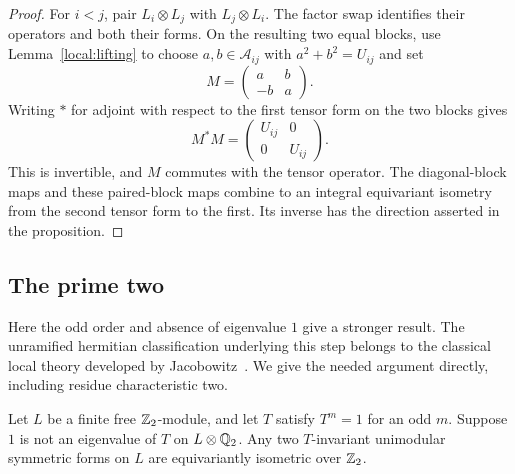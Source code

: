 \begin{proof}
For $i<j$, pair $L_i\otimes L_j$ with $L_j\otimes L_i$.
The factor swap identifies their operators and both their forms.
On the resulting two equal blocks, use
Lemma~\ref{local:lifting} to choose $a,b\in\mathcal A_{ij}$ with
$a^2+b^2=U_{ij}$ and set
\[
 M=\begin{pmatrix}a&b\\-b&a\end{pmatrix}.
\]
Writing $*$ for adjoint with respect to the first tensor form on
the two blocks gives
\[
 M^*M=\begin{pmatrix}U_{ij}&0\\0&U_{ij}\end{pmatrix}.
\]
This is invertible, and $M$ commutes with the tensor operator.
The diagonal-block maps and these paired-block maps combine to an
integral equivariant isometry from the second tensor form to the first.
Its inverse has the direction asserted in the proposition.
\end{proof}

\subsection{The prime two}

Here the odd order and absence of eigenvalue $1$ give a stronger result.
The unramified hermitian classification underlying this step belongs
to the classical local theory developed by Jacobowitz~\cite{Jacobowitz1962}.
We give the needed argument directly, including residue characteristic two.

\begin{proposition}\label{local:dyadic}
Let $L$ be a finite free $\mathbb Z_2$-module, and let $T$ satisfy $T^m=1$
for an odd $m$.  Suppose $1$ is not an eigenvalue of $T$ on
$L\otimes\mathbb Q_2$.  Any two $T$-invariant unimodular symmetric forms
on $L$ are equivariantly isometric over $\mathbb Z_2$.
\end{proposition}

